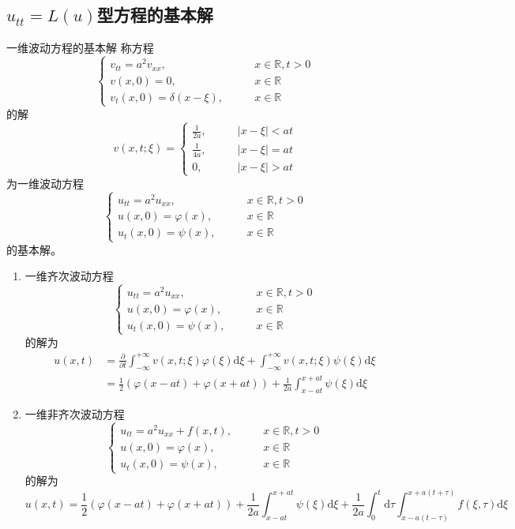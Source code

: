 \documentclass[lang = cn, scheme = chinese, thmcnt = section]{elegantbook}
\newcommand{\R}{\mathbb{R}}            %
\newcommand{\dd}{\mathrm{d}}           %
\begin{document}
\subsection{$u_{tt}=L(u)$型方程的基本解}

\begin{theorem}{一维波动方程的基本解}
	称方程%
	$$
	\begin{cases}
		v_{tt}=a^2v_{xx},\qquad & x\in\R,t>0\\
		v(x,0)=0,\qquad & x\in\R\\
		v_t(x,0)=\delta(x-\xi),\qquad & x\in\R
	\end{cases}
	$$
	的解%
	$$
	v(x,t;\xi)=\begin{cases}
		\frac{1}{2a},\qquad & |x-\xi|<at\\
		\frac{1}{4a},\qquad & |x-\xi|=at\\
		0,\qquad & |x-\xi|>at
	\end{cases}
	$$
	为一维波动方程
	$$
	\begin{cases}
		u_{tt}=a^2u_{xx},\qquad & x\in\R,t>0\\
		u(x,0)=\varphi(x),\qquad & x\in\R\\
		u_t(x,0)=\psi(x),\qquad & x\in\R
	\end{cases}
	$$
	的基本解。
	\begin{enumerate}
		\item 一维齐次波动方程
		$$
		\begin{cases}
			u_{tt}=a^2u_{xx},\qquad & x\in\R,t>0\\
			u(x,0)=\varphi(x),\qquad & x\in\R\\
			u_t(x,0)=\psi(x),\qquad & x\in\R
		\end{cases}
		$$
		的解为
		\begin{align*}
			u(x,t)
			& = \frac{\partial}{\partial t}\int_{-\infty}^{+\infty}v(x,t;\xi)\varphi(\xi)\dd\xi+\int_{-\infty}^{+\infty}v(x,t;\xi)\psi(\xi)\dd\xi\\
			& = \frac{1}{2}(\varphi(x-at)+\varphi(x+at))+\frac{1}{2a}\int_{x-at}^{x+at}\psi(\xi)\dd\xi
		\end{align*}
		\item 一维非齐次波动方程
		$$
		\begin{cases}
			u_{tt}=a^2u_{xx}+f(x,t),\qquad & x\in\R,t>0\\
			u(x,0)=\varphi(x),\qquad & x\in\R\\
			u_t(x,0)=\psi(x),\qquad & x\in\R
		\end{cases}
		$$
		的解为%
		$$
		u(x,t)
		=\frac{1}{2}(\varphi(x-at)+\varphi(x+at))+\frac{1}{2a}\int_{x-at}^{x+at}\psi(\xi)\dd\xi
		+\frac{1}{2a}\int_{0}^{t}\dd\tau\int_{x-a(t-\tau)}^{x+a(t+\tau)}f(\xi,\tau)\dd\xi
		$$
	\end{enumerate}
\end{theorem}
\end{document}
